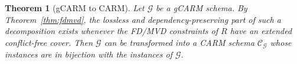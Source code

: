 \documentclass[10pt]{article}
\newtheorem{definition}{Definition}
\newtheorem{theorem}{Theorem}
\begin{document}

\begin{theorem}[\textsf{gCARM} to \textsf{CARM}]
\label{thm:gcarm-to-carm}
Let $\mathcal G$ be a \textsf{gCARM} schema. By
Theorem~\ref{thm:fdmvd}, the lossless and dependency-preserving part of
such a decomposition exists whenever the FD/MVD constraints of $R$ have
an extended conflict-free cover.  Then $\mathcal G$ can be transformed
into a \textsf{CARM} schema $\mathcal C_{\mathcal G}$ whose instances
are in bijection with the instances of $\mathcal G$.
\end{theorem}
\end{document}
